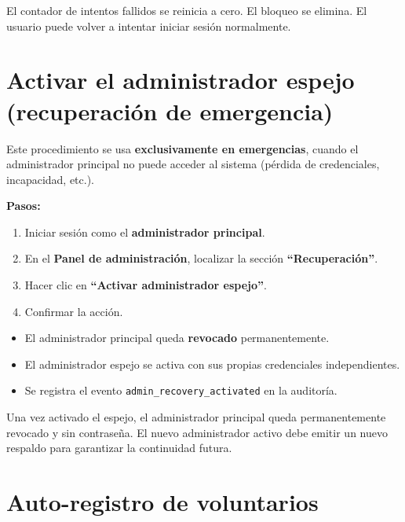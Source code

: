 \documentclass[10pt,letterpaper]{report}
\begin{document}
\begin{successbox}
  El contador de intentos fallidos se reinicia a cero. El bloqueo se elimina. El usuario puede volver a intentar iniciar sesión normalmente.
\end{successbox}

\section{Activar el administrador espejo (recuperación de emergencia)}

Este procedimiento se usa \textbf{exclusivamente en emergencias}, cuando el administrador principal no puede acceder al sistema (pérdida de credenciales, incapacidad, etc.).

\textbf{Pasos:}
\begin{enumerate}[leftmargin=2cm]
  \item Iniciar sesión como el \textbf{administrador principal}.
  \item En el \textbf{Panel de administración}, localizar la sección \textbf{``Recuperación''}.
  \item Hacer clic en \textbf{``Activar administrador espejo''}.
  \item Confirmar la acción.
\end{enumerate}

\begin{successbox}
  \begin{itemize}
    \item El administrador principal queda \textbf{revocado} permanentemente.
    \item El administrador espejo se activa con sus propias credenciales independientes.
    \item Se registra el evento \texttt{admin\_recovery\_activated} en la auditoría.
  \end{itemize}
\end{successbox}

\begin{warningbox}
  Una vez activado el espejo, el administrador principal queda permanentemente revocado y sin contraseña. El nuevo administrador activo debe emitir un nuevo respaldo para garantizar la continuidad futura.
\end{warningbox}

\section{Auto-registro de voluntarios}
\end{document}
